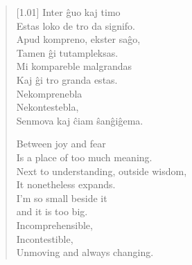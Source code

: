 \begin{verse}[1.01\textwidth]
    Inter ĝuo kaj timo\\
    Estas loko de tro da signifo.\\
    Apud kompreno, ekster saĝo,\\
    Tamen ĝi tutampleksas.\\
    Mi kompareble malgrandas\\
    Kaj ĝi tro granda estas.\\
    Nekomprenebla\\
    Nekontestebla,\\
    Senmova kaj ĉiam ŝanĝiĝema.

    \secdiv

    Between joy and fear\\
    Is a place of too much meaning.\\
    Next to understanding, outside wisdom,\\
    It nonetheless expands.\\
    I'm so small beside it\\
    and it is too big.\\
    Incomprehensible,\\
    Incontestible,\\
    Unmoving and always changing.
\end{verse}
